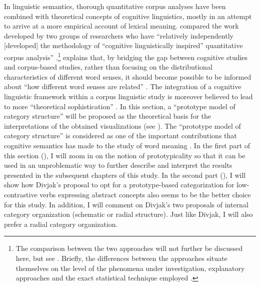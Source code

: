 In linguistic semantics, thorough quantitative corpus analyses have been combined with theoretical concepts of cognitive linguistics, mostly in an attempt to arrive at a more empirical account of lexical meaning. \citeauthor{kristiansen_methodological_2008} compared the work developed by two groups of researchers who have “relatively independently [developed] the methodology of “cognitive linguistically inspired” quantitative corpus analysis” \citep[92]{kristiansen_methodological_2008}.\footnote{The comparison between the two approaches will not further be discussed here, but see \citet{kristiansen_methodological_2008}. Briefly, the differences between the approaches situate themselves on the level of the phenomena under investigation, explanatory approaches and the exact statistical technique employed \citep[92--93]{kristiansen_methodological_2008}.} \citet{gries_corpus-based_2006} explains that, by bridging the gap between cognitive studies and corpus-based studies, rather than focusing on the distributional characteristics of different word senses, it should become possible to be informed about “how different word senses are related” \citep[57]{gries_corpus-based_2006}. The integration of a cognitive linguistic framework within a corpus linguistic study is moreover believed to lead to more “theoretical sophistication” \citep[16]{gilquin_corpus_2010}. In this section, a “prototype model of category structure” will be proposed as the theoretical basis for the interpretations of the obtained visualizations (see ). The “prototype model of category structure” is considered as one of the important contributions that cognitive semantics has made to the study of word meaning \citep[577]{allan_lexical_2013}. In the first part of this section (), I will zoom in on the notion of prototypicality so that it can be used in an unproblematic way to further describe and interpret the results presented in the subsequent chapters of this study. In the second part (), I will show how Divjak’s proposal to opt for a prototype-based categorization for low-contrastive verbs expressing abstract concepts also seems to be the better choice for this study. In addition, I will comment on Divjak’s two proposals of internal category organization (schematic or radial structure). Just like Divjak, I will also prefer a radial category organization.

